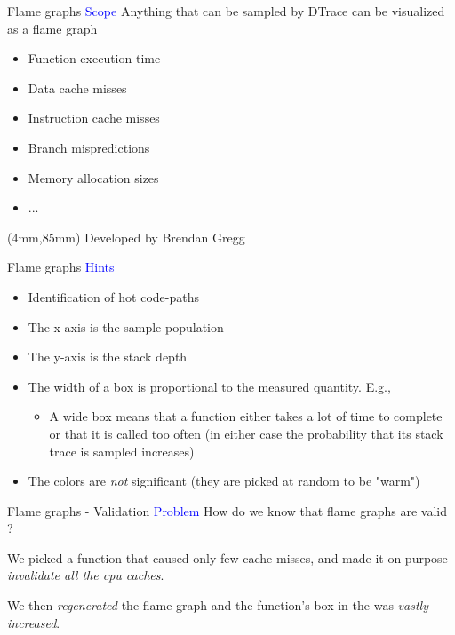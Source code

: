 \documentclass{beamer}
\newenvironment{reference}[2]{%
  \begin{textblock*}{\textwidth}(#1,#2) 
      \tiny\bgroup\color{red!50!black}}{\egroup\end{textblock*}}
\begin{document}
\begin{frame}{Flame graphs}
\textcolor{blue}{Scope} Anything that can be sampled by DTrace can be visualized as a flame graph
\begin{itemize}
\item Function execution time
\item Data cache misses
\item Instruction cache misses
\item Branch mispredictions
\item Memory allocation sizes
\item ...
\end{itemize}

\begin{reference}{4mm}{85mm}
Developed by Brendan Gregg
\end{reference}
\end{frame}

\begin{frame}{Flame graphs}
\textcolor{blue}{Hints}
\begin{itemize}
\item Identification of hot code-paths
\item The x-axis is the sample population
\item The y-axis is the stack depth
\item The width of a box is proportional to the measured quantity. E.g.,
\begin{itemize}
\item A wide box means that a function either takes a lot of time to complete or
that it is called too often (in either case the probability that its stack trace
is sampled increases)
\end{itemize}
\item The colors are \textit{not} significant (they are picked at random to be "warm")
\end{itemize}
\end{frame}

\begin{frame}{Flame graphs - Validation}
\textcolor{blue}{Problem} How do we know that flame graphs are valid ?

\vspace{5mm}

We picked a function that caused only few cache misses, and made it on purpose
\textit{invalidate all the cpu caches}.

\vspace{5mm}

We then \textit{regenerated} the flame graph and the function's box in the was
\textit{vastly increased}.
\end{frame}
\end{document}
